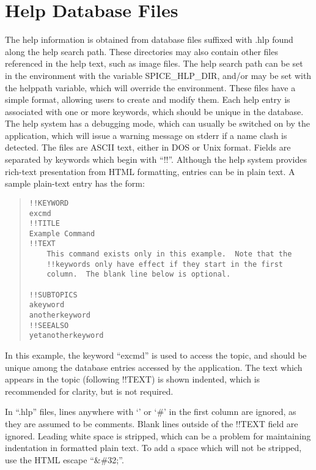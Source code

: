 \section{Help Database Files}
\label{helpfiles}


The help information is obtained from database files suffixed with
{\vt .hlp} found along the help search path.  These directories may
also contain other files referenced in the help text, such as image
files.  The help search path can be set in the environment with the
variable {\et SPICE\_HLP\_DIR}, and/or may be set with the {\vt
helppath} variable, which will override the environment.  These files
have a simple format, allowing users to create and modify them.  Each
help entry is associated with one or more keywords, which should be
unique in the database.  The help system has a debugging mode, which
can usually be switched on by the application, which will issue a
warning message on {\vt stderr} if a name clash is detected.  The
files are ASCII text, either in DOS or Unix format.  Fields are
separated by keywords which begin with ``{\vt !!}''.  Although the
help system provides rich-text presentation from HTML formatting,
entries can be in plain text.  A sample plain-text entry has the form:

\begin{quote}
\begin{verbatim}
!!KEYWORD
excmd
!!TITLE
Example Command
!!TEXT
    This command exists only in this example.  Note that the
    !!keywords only have effect if they start in the first
    column.  The blank line below is optional.

!!SUBTOPICS
akeyword
anotherkeyword
!!SEEALSO
yetanotherkeyword
\end{verbatim}
\end{quote}

In this example, the keyword ``{\vt excmd}'' is used to access the
topic, and should be unique among the database entries accessed by the
application.  The text which appears in the topic (following {\vt
!!TEXT}) is shown indented, which is recommended for clarity, but is
not required.

In ``{\vt .hlp}'' files, lines anywhere with `{\vt *}' or `{\vt \#}'
in the first column are ignored, as they are assumed to be comments.
Blank lines outside of the {\vt !!TEXT} field are ignored.  Leading
white space is stripped, which can be a problem for maintaining
indentation in formatted plain text.  To add a space which will not be
stripped, use the HTML escape ``{\vt \&\#32;}''.

